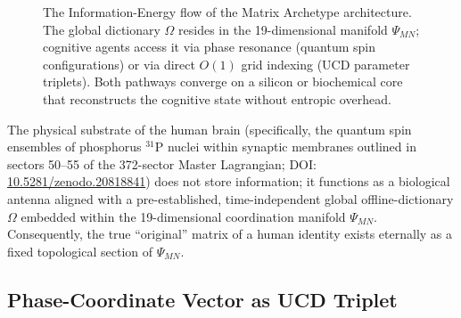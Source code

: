 \documentclass[12pt,a4paper]{article}
\begin{document}
	\begin{figure}[h!]
		\centering
		\caption{The Information-Energy flow of the Matrix Archetype architecture. The global dictionary \(\Omega\) resides in the 19-dimensional manifold \(\Psi_{MN}\); cognitive agents access it via phase resonance (quantum spin configurations) or via direct \(O(1)\) grid indexing (UCD parameter triplets). Both pathways converge on a silicon or biochemical core that reconstructs the cognitive state without entropic overhead.}
		\label{fig:matrix_flow}
	\end{figure}
	
	The physical substrate of the human brain (specifically, the quantum spin ensembles of phosphorus \(^{31}\)P nuclei within synaptic membranes outlined in sectors 50--55 of the 372-sector Master Lagrangian; DOI: \href{https://doi.org/10.5281/zenodo.20818841}{10.5281/zenodo.20818841}) does not store information; it functions as a biological antenna aligned with a pre-established, time-independent global offline-dictionary \(\Omega\) embedded within the 19-dimensional coordination manifold \(\Psi_{MN}\). Consequently, the true ``original'' matrix of a human identity exists eternally as a fixed topological section of \(\Psi_{MN}\).
	
	\subsection{Phase-Coordinate Vector as UCD Triplet}
	
\end{document}
